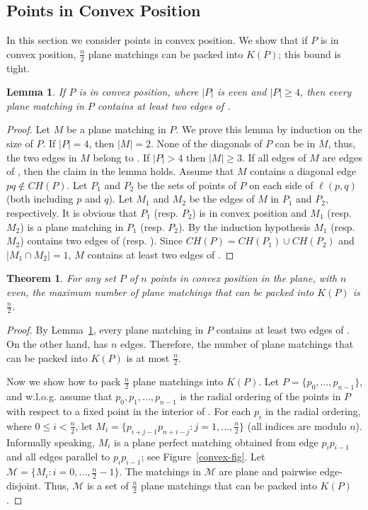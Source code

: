 \documentclass[11pt,a4paper]{article}
\newcommand{\CH}[1]{\text{$CH(#1)$}}
\newcommand{\Kn}[1]{K#1}
\newtheorem{lemma}{Lemma}
\newtheorem{theorem}{Theorem}
\begin{document}
\subsection{Points in Convex Position}
\label{convex-position-section}
In this section we consider points in convex position. We show that if $P$ is in convex position, $\frac{n}{2}$ plane matchings can be packed into $\Kn{(P)}$; this bound is tight.
\begin{lemma}
\label{two-convex-edges}
 If $P$ is in convex position, where $|P|$ is even and $|P|\ge4$, then every plane matching in $P$ contains at least two edges of \CH{P}.
\end{lemma}
\begin{proof}
Let $M$ be a plane matching in $P$. We prove this lemma by induction on the size of $P$. If $|P|=4$, then $|M|=2$. None of the diagonals of $P$ can be in $M$, thus, the two edges in $M$ belong to \CH{P}. If $|P|>4$ then $|M|\ge 3$. If all edges of $M$ are edges of \CH{P}, then the claim in the lemma holds. Assume that $M$ contains a diagonal edge $pq\notin \CH{P}$. Let $P_1$ and $P_2$ be the sets of points of $P$ on each side of $\ell(p,q)$ (both including $p$ and $q$). Let $M_1$ and $M_2$ be the edges of $M$ in $P_1$ and $P_2$, respectively. It is obvious that $P_1$ (resp. $P_2$) is in convex position and $M_1$ (resp. $M_2$) is a plane matching in $P_1$ (resp. $P_2$). By the induction hypothesis $M_1$ (resp. $M_2$) contains two edges of \CH{P_1} (resp. \CH{P_2}). Since $\CH{P}=\CH{P_1}\cup \CH{P_2}$ and $|M_1\cap M_2|=1$, $M$ contains at least two edges of \CH{P}.
\end{proof}


\begin{theorem}
\label{convex}
For any set $P$ of $n$ points in convex position in the plane, with $n$ even, the maximum number of plane matchings that can be packed into $\Kn{(P)}$ is $\frac{n}{2}$.
\end{theorem}
\begin{proof}
By Lemma~\ref{two-convex-edges}, every plane matching in $P$ contains at least two edges of \CH{P}. On the other hand, \CH{P} has $n$ edges. Therefore, the number of plane matchings that can be packed into $\Kn{(P)}$ is at most $\frac{n}{2}$.

Now we show how to pack $\frac{n}{2}$ plane matchings into $\Kn{(P)}$.
Let $P=\{p_0,\dots,p_{n-1}\}$, and w.l.o.g. assume that $p_0,p_1,\dots,p_{n-1}$ is the radial ordering of the points in $P$ with respect to a fixed point in the interior of \CH{P}. For each $p_i$ in the radial ordering, where $0\le i<\frac{n}{2}$, let $M_i=\{p_{i+j-1}p_{n+i-j}:j=1,\dots,\frac{n}{2}\}$ (all indices are modulo $n$). Informally speaking, $M_i$ is a plane perfect matching obtained from edge $p_ip_{i-1}$ and all edges parallel to $p_ip_{i-1}$; see Figure~\ref{convex-fig}. Let $\mathcal{M}=\{M_i:i=0,\dots,\frac{n}{2}-1\}$. The matchings in $\mathcal{M}$ are plane and pairwise edge-disjoint. Thus, $\mathcal{M}$ is a set of $\frac{n}{2}$ plane matchings that can be packed into $\Kn{(P)}$.  
\end{proof}
\end{document}
